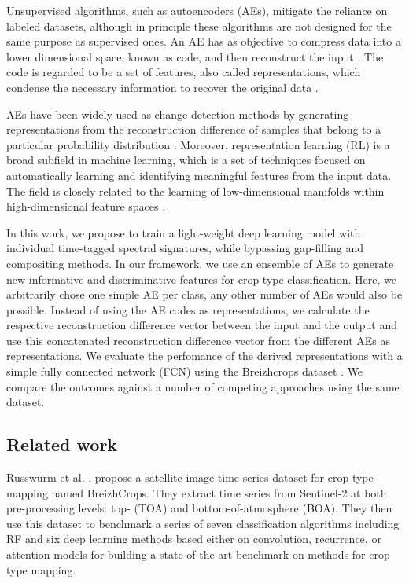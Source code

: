 \documentclass[journal,article,submit,pdftex,moreauthors]{Definitions/mdpi}
\begin{document}
Unsupervised algorithms, such as autoencoders (AEs), mitigate the reliance on labeled datasets, although in principle these algorithms 
are not designed for the same purpose as supervised ones. An AE has as objective to compress data into a lower dimensional 
space, known as code, and then reconstruct the input \cite{ML2023}.  The code is regarded to be a set of features, also called representations, 
which condense the necessary information to recover the original data \cite{LopezPinaya2020}.

AEs have been widely used as change detection methods by generating representations from the reconstruction difference of 
samples that belong to a particular probability distribution \cite{LopezFandino2018,Luppino2024,Kalinicheva2019}. 
Moreover, representation learning (RL) is a broad subfield in machine learning, which is a set of techniques focused on 
automatically learning and identifying meaningful features from the input data. The field is closely related to the learning of low-dimensional manifolds within high-dimensional feature spaces
\cite{Swope2021, Bengio2013, Neumann2019, Li2022, Bengio2012, Engelen2019, Ericsson2022}.

In this work, we propose to train a light-weight deep learning model with individual time-tagged spectral signatures, while bypassing gap-filling and compositing methods.
In our framework, we use an ensemble of AEs to generate new informative and discriminative features for crop type classification. 
Here, we arbitrarily chose one simple AE per class, any other number of AEs would also be possible.
Instead of using the AE codes as representations, we calculate the respective reconstruction difference vector between the input and the output and use this concatenated reconstruction difference vector from the different AEs as representations. 
We evaluate the perfomance of the derived representations with a simple fully connected network (FCN) using the Breizhcrops dataset \cite{Russwurm2020}. 
We compare the outcomes against a number of competing approaches using the same dataset.


\subsection{Related work}
Russwurm et al. \cite{Russwurm2020}, propose a satellite image time series dataset for crop type mapping named BreizhCrops. 
They extract time series from Sentinel-2 at both pre-processing levels: top- (TOA) and bottom-of-atmosphere (BOA). 
They then use this dataset to benchmark a series of seven classification algorithms including RF and six deep learning 
methods based either on convolution, recurrence, or attention models for building a state-of-the-art benchmark on methods 
for crop type mapping.
\end{document}
